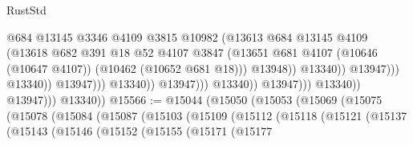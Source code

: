 \begin{lexlean}{RustStd}
\begin{coremodule}
                                                          @684
                                                          @13145
                                                          @3346
                                                          @4109
                                                          @3815
                                                          @10982
                                                          (@13613
                                                            @684
                                                            @13145
                                                            @4109
                                                            (@13618
                                                              @682
                                                              @391
                                                              @18
                                                              @52
                                                              @4107
                                                              @3847
                                                              (@13651
                                                                @681
                                                                @4107
                                                                (@10646 (@10647 @4107))
                                                                (@10462 (@10652 @681 @18)))
                                                              @13948))
                                                          @13340))
                                                      @13947)))
                                                @13340))
                                            @13947)))
                                      @13340))
                                  @13947)))
                            @13340))
                        @13947)))
                  @13340))
              @13947)))
        @13340))
@15566 := @15044
    (@15050
      (@15053
        (@15069
          (@15075
            (@15078
              (@15084
                (@15087
                  (@15103
                    (@15109
                      (@15112
                        (@15118
                          (@15121
                            (@15137
                              (@15143
                                (@15146
                                  (@15152
                                    (@15155
                                      (@15171
                                        (@15177

\end{coremodule}
\end{lexlean}
